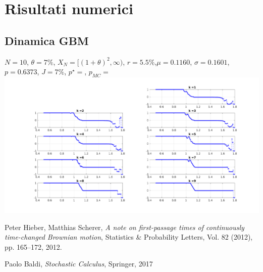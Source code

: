 \documentclass[12pt,a4paper]{article}
\theoremstyle{break}
\begin{document}
\section{Risultati numerici}
\subsection{Dinamica GBM}
$N=10$, $\theta=7\%$, $X_N= [(1+\theta)^2,\infty)$, $r= 5.5\%$,$\mu= 0.1160$, $\sigma = 0.1601$, $p = 0.6373$, $J=7\%$, $p^{\star}=$, $p_{MC} = $
\centering
\includegraphics[scale = 0.5]{maps.png}

\begin{thebibliography}{9}
	
	Peter Hieber, Matthias Scherer,
	\textit{A note on first-passage times of continuously time-changed Brownian motion},
	Statistics \& Probability Letters, Vol. 82 (2012), pp. 165–172,
	2012.
	
	Paolo Baldi,
	\textit{Stochastic Calculus},
	Springer, 2017

\end{thebibliography}
\end{document}
